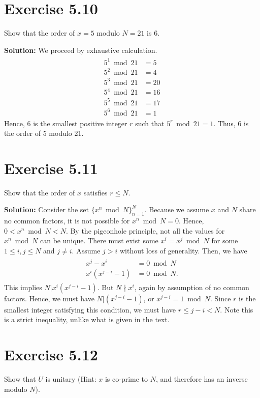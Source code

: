 \documentclass{book}
\begin{document}
\section*{Exercise 5.10}
    Show that the order of $x=5$ modulo $N=21$ is 6.
    
    \textbf{Solution:} We proceed by exhaustive calculation.
    \begin{align}
    \begin{aligned}
        5^1 \bmod 21 &= 5 \\
        5^2 \bmod 21 &= 4 \\
        5^3 \bmod 21 &= 20\\
        5^4 \bmod 21 &= 16\\
        5^5 \bmod 21 &= 17\\
        5^6 \bmod 21 &= 1
    \end{aligned}
    \end{align}
    Hence, 6 is the smallest positive integer $r$ such that $5^r \bmod 21 = 1$. Thus, 6 is the order of 5 modulo 21.

\section*{Exercise 5.11}
    Show that the order of $x$ satisfies $r\leq N$.
    
    \textbf{Solution:} Consider the set $\{x^n \bmod N\}_{n=1}^N$. Because we assume $x$ and $N$ share no common factors, it is not possible for $x^n \bmod N = 0$. Hence, $0< x^n \bmod N < N$. By the pigeonhole principle, not all the values for $x^n \bmod N$ can be unique. There must exist some $x^i = x^j \bmod N$ for some $1\leq i,j \leq N$ and $j\neq i$. Assume $j>i$ without loss of generality. Then, we have
    \begin{align}
    \begin{aligned}
        x^j-x^i &= 0 \bmod N \\
        x^i(x^{j-i}-1) &=0 \bmod N.
    \end{aligned}
    \end{align}
    This implies $N|x^i(x^{j-i}-1)$. But $N\nmid x^i$, again by assumption of no common factors. Hence, we must have $N|(x^{j-i}-1)$, or $x^{j-i} = 1 \bmod N$. Since $r$ is the smallest integer satisfying this condition, we must have $r\leq j-i < N$. Note this is a strict inequality, unlike what is given in the text.

\section*{Exercise 5.12}
    Show that $U$ is unitary (Hint: $x$ is co-prime to $N$, and therefore has an inverse modulo $N$).
    
\end{document}
